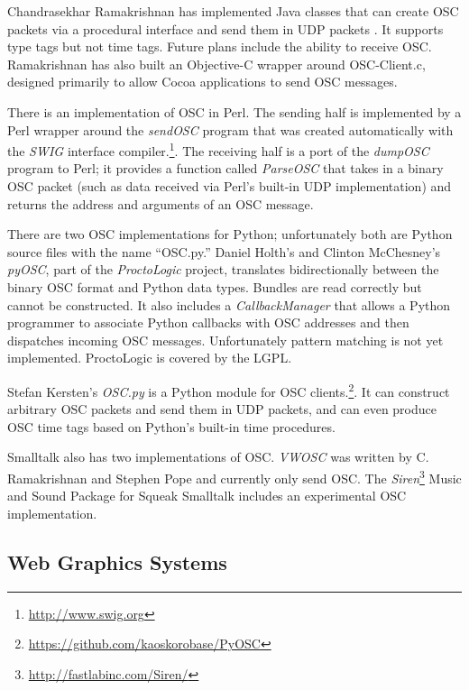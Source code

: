 Chandrasekhar Ramakrishnan has implemented Java classes that can create OSC packets via a procedural interface and send them in UDP packets \cite{Ramakrishnan:2003}.  It supports type tags but not time tags.  Future plans include the ability to
receive OSC. Ramakrishnan has also built an Objective-C wrapper around OSC-Client.c, designed primarily to allow Cocoa applications to send OSC messages.

There is an implementation of OSC in Perl. %
The sending half is implemented by a Perl wrapper around the \textit{sendOSC} program that was created automatically with the \textit{SWIG} interface compiler.\footnote{\url{http://www.swig.org}}.  The receiving half is a port of the \textit{dumpOSC} program to Perl; it provides a function called \textit{ParseOSC} that takes in a binary OSC packet (such as data received via Perl's built-in UDP implementation) and returns the address and arguments of an OSC message.

There are two OSC implementations for Python; unfortunately both are Python source files with the name ``OSC.py.'' Daniel Holth's and Clinton McChesney's \textit{pyOSC}, part of the \textit{ProctoLogic} project, translates bidirectionally between the binary OSC format and Python data types. Bundles are read correctly but cannot be constructed. It also includes a \textit{CallbackManager} that allows a Python programmer to associate Python callbacks with OSC  addresses and then dispatches incoming OSC messages. Unfortunately pattern matching is not yet implemented. ProctoLogic is covered by the LGPL.

Stefan Kersten's \textit{OSC.py} is a Python module for OSC clients.\footnote{\url{https://github.com/kaoskorobase/PyOSC}}.  It can construct arbitrary OSC packets and send them in UDP packets, and can even produce OSC time tags based on Python's built-in time procedures.

Smalltalk also has two implementations of OSC. \textit{VWOSC} %
was written by C. Ramakrishnan and Stephen Pope and currently only send OSC.  The \textit{Siren}\footnote{\url{http://fastlabinc.com/Siren/}} Music and Sound Package for Squeak Smalltalk includes an experimental OSC implementation.

\subsection{Web Graphics Systems}

